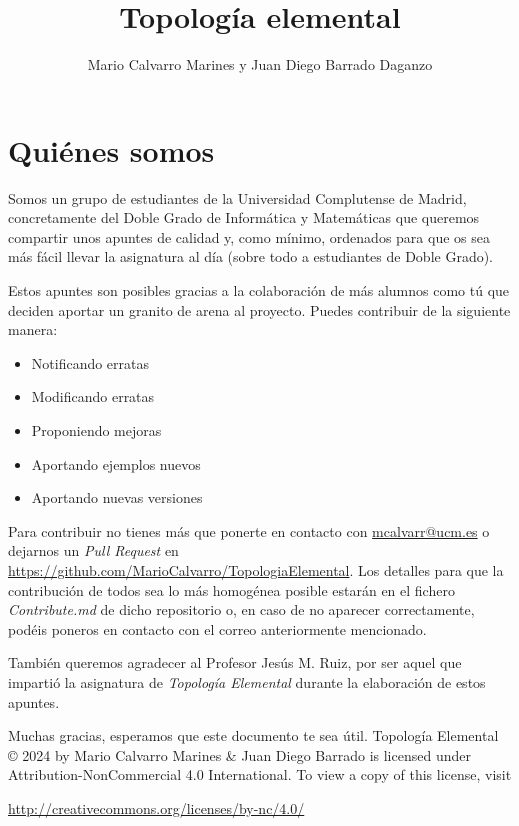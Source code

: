 \documentclass[10pt,a4paper,openright]{book}
\title{\Huge Topología elemental}
\author{Mario Calvarro Marines y Juan Diego Barrado Daganzo}
\date{}
\begin{document}
\frontmatter
\maketitle
\setcounter{tocdepth}{3}%
{
    \hypersetup{linkcolor=black}
    \tableofcontents
}
\newpage

\section*{Quiénes somos}
Somos un grupo de estudiantes de la Universidad Complutense de Madrid, concretamente del Doble Grado de Informática y Matemáticas que queremos compartir unos apuntes de calidad y, como mínimo, ordenados para que os sea más fácil llevar la asignatura al día (sobre todo a estudiantes de Doble Grado).

Estos apuntes son posibles gracias a la colaboración de más alumnos como tú que deciden aportar un granito de arena al proyecto. Puedes contribuir de la siguiente manera:
\begin{itemize}
\item Notificando erratas
\item Modificando erratas
\item Proponiendo mejoras
\item Aportando ejemplos nuevos
\item Aportando nuevas versiones
\end{itemize}
Para contribuir no tienes más que ponerte en contacto con
\href{mailto:mcalvarr@ucm.es}{mcalvarr@ucm.es} o dejarnos un \textit{Pull
Request} en \url{https://github.com/MarioCalvarro/TopologiaElemental}. Los detalles para que la contribución de todos sea lo más homogénea posible estarán en el fichero \textit{Contribute.md} de dicho repositorio o, en caso de no aparecer correctamente, podéis poneros en contacto con el correo anteriormente mencionado.

También queremos agradecer al Profesor Jesús M. Ruiz, por ser aquel que impartió
la asignatura de \textit{Topología Elemental} durante la elaboración de estos
apuntes.

Muchas gracias, esperamos que este documento te sea útil.
\vfill
Topología Elemental © 2024 by Mario Calvarro Marines \& Juan Diego Barrado is licensed under Attribution-NonCommercial 4.0 International. To view a copy of this license, visit
\begin{center}
\url{http://creativecommons.org/licenses/by-nc/4.0/}
\end{center}
\end{document}
